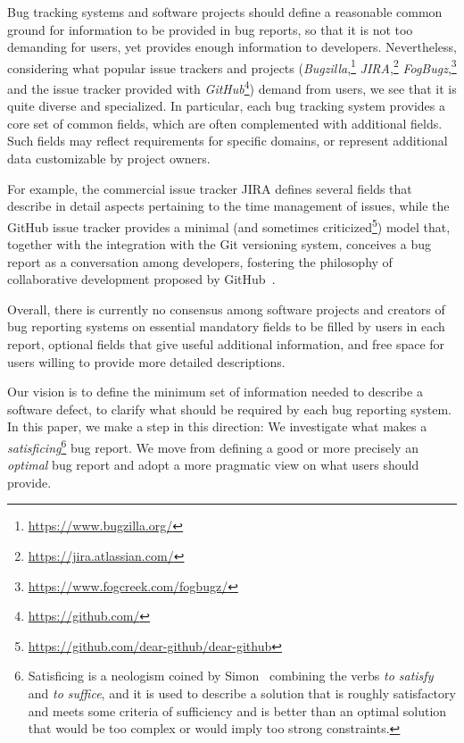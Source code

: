 Bug tracking systems and software projects should define a reasonable common ground for information to be provided in bug reports, so that it is not too demanding for users, yet provides enough information to developers.
Nevertheless, considering what popular issue trackers and projects (\eg \emph{Bugzilla},\footnote{\url{https://www.bugzilla.org/}} \emph{JIRA},\footnote{\url{https://jira.atlassian.com/}} \emph{FogBugz},\footnote{\url{https://www.fogcreek.com/fogbugz/}} and the issue tracker provided with \emph{GitHub}\footnote{\url{https://github.com/}}) demand from users, we see that it is quite diverse and specialized.
In particular, each bug tracking system provides a core set of common fields, which are often complemented with additional fields.
Such  fields may reflect requirements for specific domains, or represent additional data customizable by project owners.

For example, the commercial issue tracker JIRA defines several fields that describe in detail aspects pertaining to the time management of issues, while the GitHub issue tracker provides a minimal (and sometimes criticized\footnote{\url{https://github.com/dear-github/dear-github}}) model that, together with the integration with the Git versioning system, conceives a bug report as a conversation among developers, fostering the philosophy of collaborative development proposed by GitHub~\cite{Thun2013}.

Overall, there is currently no consensus among software projects and creators of bug reporting systems on essential mandatory fields to be filled by users in each report, optional fields that give useful additional information, and free space for users willing to provide more detailed descriptions.

Our vision is to define the minimum set of information needed to describe a software defect, to clarify what should be required by each bug reporting system.
In this paper, we make a step in this direction: We investigate what makes a \emph{satisficing}\footnote{Satisficing is a neologism coined by Simon~\cite{Simo57,Simo01} combining the verbs {\em to satisfy} and {\em to suffice}, and it is used to describe a solution that is roughly satisfactory and meets some criteria of sufficiency and is better than an optimal solution that would be too complex or would imply too strong constraints.} bug report.
We move from defining a good or more precisely an \emph{optimal} bug report and adopt a more pragmatic view on what users should provide.



